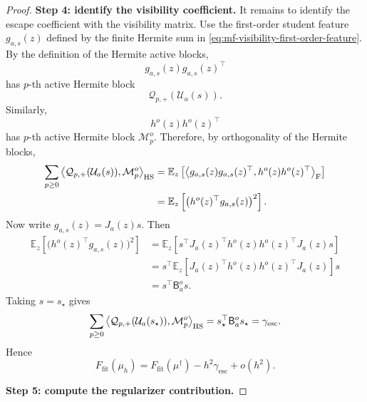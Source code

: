 \begin{proof}
\par\noindent\textbf{Step 4: identify the visibility coefficient.}
It remains to identify the escape coefficient with the visibility matrix.
Use the first-order student feature $g_{a,s}(z)$ defined by the finite
Hermite sum in \eqref{eq:mf-visibility-first-order-feature}.
By the definition of the Hermite active blocks,
\[
    g_{a,s}(z)g_{a,s}(z)^\top
\]
has \(p\)-th active Hermite block
\[
    \mathcal Q_{p,+}(\mathcal U_a(s)).
\]
Similarly,
\[
    h^o(z)h^o(z)^\top
\]
has \(p\)-th active Hermite block \(\mathcal M_p^o\).  Therefore, by
orthogonality of the Hermite blocks,
\begin{align}
    \sum_{p\ge0}
    \left\langle
        \mathcal Q_{p,+}(\mathcal U_a(s)),
        \mathcal M_p^o
    \right\rangle_{\mathrm{HS}}
    &=
    \mathbb E_z
    \left[
        \left\langle
            g_{a,s}(z)g_{a,s}(z)^\top,
            h^o(z)h^o(z)^\top
        \right\rangle_{\mathrm F}
    \right]
    \\
    &=
    \mathbb E_z
    \left[
        \bigl(h^o(z)^\top g_{a,s}(z)\bigr)^2
    \right].
\end{align}
Now write \(g_{a,s}(z)=J_a(z)s\).  Then
\begin{align}
    \mathbb E_z
    \left[
        \bigl(h^o(z)^\top g_{a,s}(z)\bigr)^2
    \right]
    &=
    \mathbb E_z
    \left[
        s^\top J_a(z)^\top h^o(z)h^o(z)^\top J_a(z)s
    \right]
    \\
    &=
    s^\top
    \mathbb E_z
    \left[
        J_a(z)^\top h^o(z)h^o(z)^\top J_a(z)
    \right]
    s
    \\
    &=
    s^\top\mathsf B_a^o s.
\end{align}
Taking \(s=s_\star\) gives
\[
    \sum_{p\ge0}
    \left\langle
        \mathcal Q_{p,+}(\mathcal U_a(s_\star)),
        \mathcal M_p^o
    \right\rangle_{\mathrm{HS}}
    =
    s_\star^\top\mathsf B_a^o s_\star
    =
    \gamma_{\mathrm{esc}}.
\]
Hence
\[
    F_{\mathrm{fit}}(\mu_h)
    =
    F_{\mathrm{fit}}(\mu^\dagger)
    -
    h^2\gamma_{\mathrm{esc}}
    +
    o(h^2).
\]


\par\noindent\textbf{Step 5: compute the regularizer contribution.}


\end{proof}
